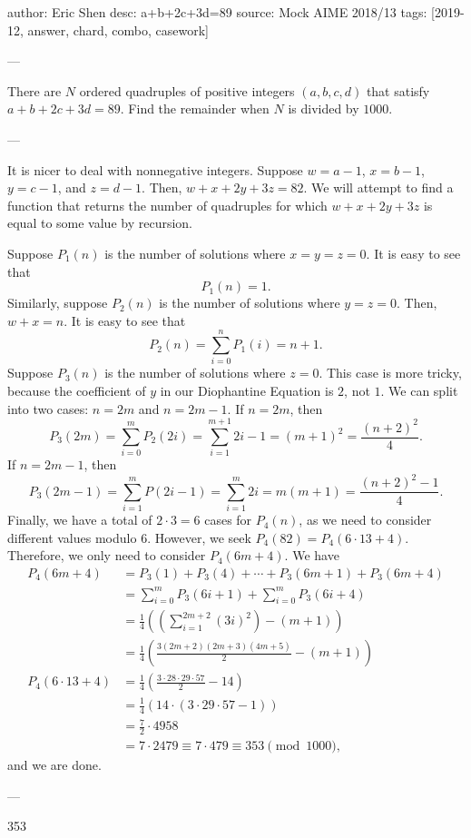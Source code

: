 author: Eric Shen
desc: a+b+2c+3d=89
source: Mock AIME 2018/13
tags: [2019-12, answer, chard, combo, casework]

---

There are $N$ ordered quadruples of positive integers $(a,b,c,d)$ that satisfy $a+b+2c+3d=89$. Find the remainder when $N$ is divided by $1000$.

---

It is nicer to deal with nonnegative integers. Suppose $w=a-1$, $x=b-1$, $y=c-1$, and $z=d-1$. Then, $w+x+2y+3z=82$. We will attempt to find a function that returns the number of quadruples for which $w+x+2y+3z$ is equal to some value by recursion.

Suppose $P_1(n)$ is the number of solutions where $x=y=z=0$. It is easy to see that \[P_1(n)=1.\]
Similarly, suppose $P_2(n)$ is the number of solutions where $y=z=0$. Then, $w+x=n$. It is easy to see that \[P_2(n)=\sum_{i=0}^n P_1(i)=n+1.\]
Suppose $P_3(n)$ is the number of solutions where $z=0$. This case is more tricky, because the coefficient of $y$ in our Diophantine Equation is $2$, not $1$. We can split into two cases: $n=2m$ and $n=2m-1$. If $n=2m$, then \[P_3(2m)=\sum_{i=0}^m P_2(2i)=\sum_{i=1}^{m+1} 2i-1=(m+1)^2=\frac{(n+2)^2}{4}.\]
If $n=2m-1$, then \[P_3(2m-1)=\sum_{i=1}^m P(2i-1)=\sum_{i=1}^m 2i=m(m+1)=\frac{(n+2)^2-1}{4}.\]
Finally, we have a total of $2\cdot 3=6$ cases for $P_4(n)$, as we need to consider different values modulo $6$. However, we seek $P_4(82)=P_4(6\cdot 13+4)$. Therefore, we only need to consider $P_4(6m+4)$. We have
\begin{align*}
    P_4(6m+4)&=P_3(1)+P_3(4)+\cdots+P_3(6m+1)+P_3(6m+4)\\
    &=\sum_{i=0}^m P_3(6i+1)+\sum_{i=0}^m P_3(6i+4)\\
    &=\frac{1}{4}\left(\left(\sum_{i=1}^{2m+2} (3i)^2\right)-(m+1)\right)\\
    &=\frac{1}{4}\left(\frac{3(2m+2)(2m+3)(4m+5)}{2}-(m+1)\right)\\
    P_4(6\cdot 13+4)&=\frac{1}{4}\left(\frac{3\cdot 28\cdot 29\cdot 57}{2}-14\right)\\
    &=\frac{1}{4}\left(14\cdot (3\cdot 29\cdot 57-1)\right)\\
    &=\frac{7}{2}\cdot 4958\\
    &=7\cdot 2479\equiv 7\cdot 479\equiv 353\pmod{1000},
\end{align*}
and we are done.

---

353
